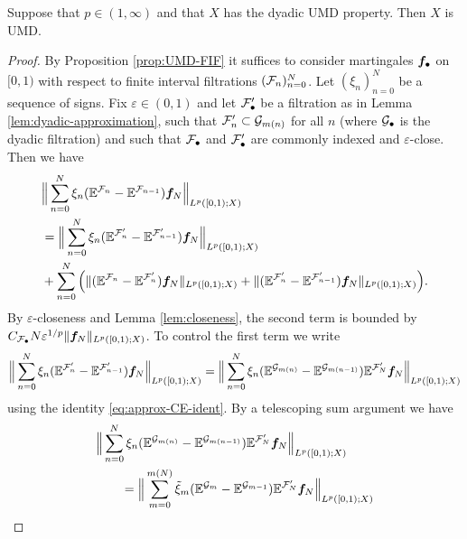 \begin{thm}\label{thm:dyadic-UMD}
  Suppose that $p \in (1,\infty)$ and that $X$ has the dyadic UMD property.
  Then $X$ is UMD.
\end{thm}

\begin{proof}
  By Proposition \ref{prop:UMD-FIF} it suffices to consider martingales $\bm{f}_{\bullet}$ on $[0,1)$ with respect to finite interval filtrations $(\mathcal{F}_{n})_{n=0}^{N}$.
  Let $(\xi_{n})_{n=0}^{N}$ be a sequence of signs.
  Fix $\varepsilon \in (0,1)$ and let $\mathcal{F}'_{\bullet}$ be a filtration as in Lemma \ref{lem:dyadic-approximation}, such that $\mathcal{F}_{n}' \subset \mathcal{G}_{m(n)}$ for all $n$ (where $\mathcal{G}_{\bullet}$ is the dyadic filtration) and such that $\mathcal{F}_{\bullet}$ and $\mathcal{F}_{\bullet}'$ are commonly indexed and $\varepsilon$-close.
  Then we have
  \begin{equation*}
    \begin{aligned}
      &\Big\| \sum_{n=0}^{N} \xi_{n} (\mathbb{E}^{\mathcal{F}_{n}} - \mathbb{E}^{\mathcal{F}_{n-1}}) \bm{f}_{N} \Big\|_{L^p([0,1);X)} \\
      &= \Big\| \sum_{n=0}^{N} \xi_{n} (\mathbb{E}^{\mathcal{F}'_{n}} - \mathbb{E}^{\mathcal{F}'_{n-1}}) \bm{f}_{N} \Big\|_{L^p([0,1);X)} \\
      &+ \sum_{n=0}^{N} \Big( \| (\mathbb{E}^{\mathcal{F}_{n}} - \mathbb{E}^{\mathcal{F}'_{n}}) \bm{f}_{N}\|_{L^p([0,1);X)}
      +  \| (\mathbb{E}^{\mathcal{F}'_{n}} - \mathbb{E}^{\mathcal{F}'_{n-1}}) \bm{f}_{N} \|_{L^p([0,1);X)} \Big).
    \end{aligned}
  \end{equation*}
  By $\varepsilon$-closeness and Lemma \ref{lem:closeness}, the second term is bounded by $C_{\mathcal{F}_{\bullet}} N \varepsilon^{1/p} \|\bm{f}_{N}\|_{L^p([0,1);X)}$.
  To control the first term we write
  \begin{equation*}
    \Big\| \sum_{n=0}^{N} \xi_{n} (\mathbb{E}^{\mathcal{F}'_{n}} - \mathbb{E}^{\mathcal{F}'_{n-1}}) \bm{f}_{N} \Big\|_{L^p([0,1);X)}
    = \Big\| \sum_{n=0}^{N} \xi_{n} (\mathbb{E}^{\mathcal{G}_{m(n)}} - \mathbb{E}^{\mathcal{G}_{m(n-1)}}) \mathbb{E}^{\mathcal{F}'_{N}} \bm{f}_{N} \Big\|_{L^p([0,1);X)}
  \end{equation*}
  using the identity \eqref{eq:approx-CE-ident}.
  By a telescoping sum argument we have
  \begin{equation*}
    \begin{aligned}
      &\Big\| \sum_{n=0}^{N} \xi_{n} (\E^{\mc{G}_{m(n)}} - \E^{\mc{G}_{m(n-1)}}) \E^{\mc{F}'_{N}} \mb{f}_{N} \Big\|_{L^p([0,1);X)} \\
      &\qquad = \Big\| \sum_{m=0}^{m(N)} \tilde{\xi}_{m} (\E^{\mc{G}_{m}} - \E^{\mc{G}_{m-1}}) \E^{\mc{F}'_{N}} \mb{f}_{N} \Big\|_{L^p([0,1);X)}

\end{aligned}
\end{equation*}
\end{proof}

